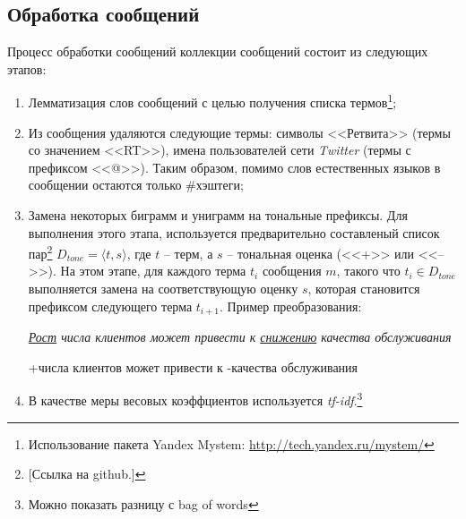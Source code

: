     \subsection{Обработка сообщений}
    \label{sec:buildingMsgProcessing}
    Процесс обработки сообщений коллекции сообщений состоит из следующих этапов:
    \begin{enumerate}
        \item Лемматизация слов сообщений с целью получения списка термов\footnote{
            Использование пакета Yandex Mystem:
            \url{http://tech.yandex.ru/mystem/}
        };

        \item Из сообщения удаляются следующие термы:
            символы <<Ретвита>> (термы со значением <<RT>>),
            имена пользователей сети {\it Twitter} (термы с префиксом <<@>>).
            Таким образом, помимо слов естественных языков в сообщении остаются
            только \#хэштеги;
        \item Замена некоторых биграмм и униграмм на тональные префиксы.
            Для выполнения этого этапа, используется предварительно составленый
            список пар\footnote{
                [Ссылка на github.]
            }
            $D_{tone} = {\langle t, s\rangle}$, где $t$ -- терм, а $s$ --
            тональная оценка (<<+>> или <<-->>). На этом этапе, для каждого терма $t_i$
            сообщения $m$, такого что $t_i \in D_{tone}$ выполняется замена на соответствующую
            оценку $s$, которая становится префиксом следующего терма $t_{i+1}$.
            Пример преобразования:
            \begin{center}
                \it
                \underline{Рост} числа клиентов может привести к \underline{снижению} качества обслуживания

               +числа клиентов может привести к -качества обслуживания
            \end{center}
        \item В качестве меры весовых коэффциентов используется {\it tf-idf}.\footnote{
                Можно показать разницу с bag of words
            }
    \end{enumerate}

